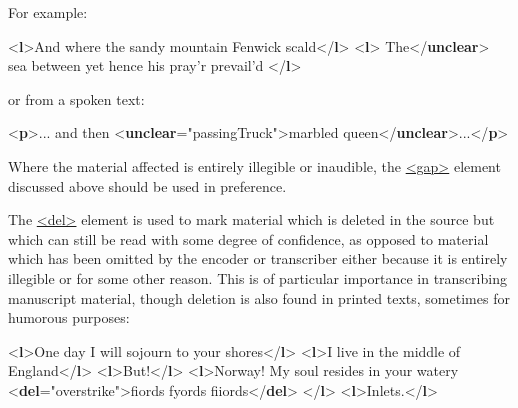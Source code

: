 For example: \par\bgroup{}\exampleFont \begin{shaded}\noindent\mbox{}{<\textbf{l}>}And where the sandy mountain Fenwick scald{</\textbf{l}>}\mbox{}\newline 
{<\textbf{l}>}\mbox{}\newline 
{}The{</\textbf{unclear}>} sea between\mbox{}\newline 
 yet hence his pray'r prevail'd\mbox{}\newline 
{</\textbf{l}>}\end{shaded}\egroup\par \noindent  or from a spoken text: \par\bgroup{}\exampleFont \begin{shaded}\noindent\mbox{}{<\textbf{p}>}... and then {<\textbf{unclear}\hspace*{1em}{reason}="{passingTruck}">}marbled queen{</\textbf{unclear}>}...{</\textbf{p}>}\end{shaded}\egroup\par \par
Where the material affected is entirely illegible or inaudible, the \hyperref[TEI.gap]{<gap>} element discussed above should be used in preference.\par
The \hyperref[TEI.del]{<del>} element is used to mark material which is deleted in the source but which can still be read with some degree of confidence, as opposed to material which has been omitted by the encoder or transcriber either because it is entirely illegible or for some other reason. This is of particular importance in transcribing manuscript material, though deletion is also found in printed texts, sometimes for humorous purposes: \par\bgroup{}\exampleFont \begin{shaded}\noindent\mbox{}{<\textbf{l}>}One day I will sojourn to your shores{</\textbf{l}>}\mbox{}\newline 
{<\textbf{l}>}I live in the middle of England{</\textbf{l}>}\mbox{}\newline 
{<\textbf{l}>}But!{</\textbf{l}>}\mbox{}\newline 
{<\textbf{l}>}Norway! My soul resides in your watery\mbox{}\newline 
{<\textbf{del}\hspace*{1em}{rend}="{overstrike}">}fiords fyords fiiords{</\textbf{del}>}\mbox{}\newline 
{</\textbf{l}>}\mbox{}\newline 
{<\textbf{l}>}Inlets.{</\textbf{l}>}\end{shaded}\egroup\par \par
